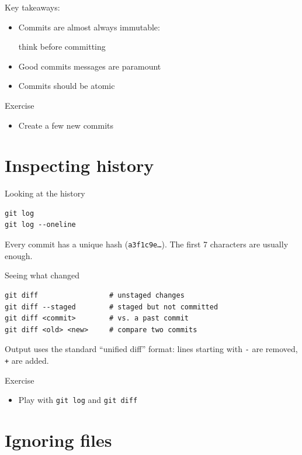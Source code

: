 \documentclass[11pt]{beamer}
\newcommand{\exercise}[1]{
  \begin{frame}{Exercise}
    #1
  \end{frame}
}
\begin{document}
\begin{frame}
  Key takeaways: \LARGE 
  \begin{itemize}
  \item Commits are {\tiny almost always} immutable:

    think before committing
  \item Good commits messages are paramount
  \item Commits should be atomic
  \end{itemize}
\end{frame}


\exercise{
  \begin{itemize}
  \item
    Create a few new commits
  \end{itemize}
}
\section{Inspecting history}

\begin{frame}[fragile]{Looking at the history}
\begin{lstlisting}
git log
git log --oneline
\end{lstlisting}
  \vfill
  Every commit has a unique hash (\texttt{a3f1c9e\ldots}). The first
  7 characters are usually enough.
\end{frame}

\begin{frame}[fragile]{Seeing what changed}
\begin{lstlisting}
git diff                 # unstaged changes
git diff --staged        # staged but not committed
git diff <commit>        # vs. a past commit
git diff <old> <new>     # compare two commits
\end{lstlisting}
  \vfill
  Output uses the standard ``unified diff'' format:
  lines starting with \texttt{-} are removed, \texttt{+} are added.
\end{frame}

\exercise{
  \begin{itemize}
  \item Play with \texttt{git log} and \texttt{git diff}
  \end{itemize}
}

\section{Ignoring files}
\end{document}
